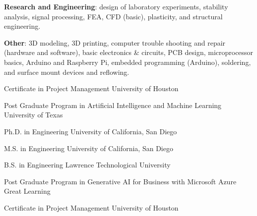 \documentclass{leresume}
\begin{document}
\begin{bulletedlist}
		\item \textbf{Research and Engineering}: design of laboratory experiments,
                        stability analysis,
                        signal processing,
                        FEA,
                        CFD (basic),
                        plasticity,
                        and structural engineering.
                        
		\item \textbf{Other}: 3D modeling,
                        3D printing,
                        computer trouble shooting and repair (hardware and software),
                        basic electronics \& circuits,
                        PCB design,
                        microprocessor basics,
                        Arduino and Raspberry Pi,
                        embedded programming (Arduino),
                        soldering,
                        and surface mount devices and reflowing.
                        
	\end{bulletedlist}

	
                {Certificate in Project Management}
                {University of Houston}
		
                {Post Graduate Program in Artificial Intelligence and Machine Learning}
                {University of Texas}
		
                {Ph.D. in Engineering}
                {University of California, San Diego}
		
                {M.S. in Engineering}
                {University of California, San Diego}
		
                {B.S. in Engineering}
                {Lawrence Technological University}
		
		
	
                {Post Graduate Program in Generative AI for Business with Microsoft Azure}
                {Great Learning}
		
                {Certificate in Project Management}
                {University of Houston}
		

    
\end{document}
